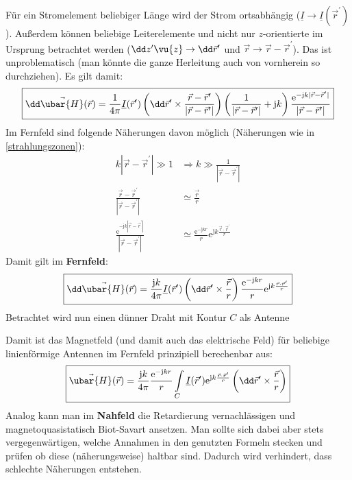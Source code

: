 Für ein Stromelement beliebiger Länge wird der Strom ortsabhängig (\(\underline{I}\to \underline{I}(\vec{r}^\prime )\)). Außerdem können beliebige Leiterelemente und nicht nur $z$-orientierte im Ursprung  betrachtet werden (\(\dd z^\prime \vu{z} \to \dd\vec{r}^\prime \) und \(\vec{r}  \to \vec{r}  - \vec{r}^\prime \)). Das ist unproblematisch (man könnte die ganze Herleitung auch von vornherein so durchziehen). Es gilt damit:
		        \begin{equation}
			        \boxed{\dd\vec{\ubar{H}}(\vec{r} ) = \frac{1}{4\pi} \underline{I}(\vec{r}^\prime ) \left( \dd\vec{r}^\prime  \times \frac{\vec{r} -\vec{r}^\prime }{|\vec{r} -\vec{r}^\prime |} \right) \left(\frac{1}{|\vec{r} -\vec{r}^\prime |} +\mathrm{j} k \right) \frac{ \mathrm{e}^{-\mathrm{j} k |\vec{r} -\vec{r}^\prime |}}{|\vec{r} -\vec{r}^\prime |}}
		        \end{equation}
Im Fernfeld sind folgende Näherungen davon möglich (Näherungen wie in \ref{strahlungszonen}):
		        \begin{equation}\begin{split}
				        k |\vec{r} -\vec{r}^\prime | \gg 1 &\Rightarrow  k \gg \frac{1}{|\vec{r} -\vec{r}^\prime |}\\
				        \frac{\vec{r} -\vec{r}^\prime }{|\vec{r} -\vec{r}^\prime |} &\simeq \frac{\vec{r} }{r}\\
				        \frac{ \mathrm{e}^{-\mathrm{j} k |\vec{r} -\vec{r}^\prime |}}{|\vec{r} -\vec{r}^\prime |} &\simeq \frac{ \mathrm{e}^{-\mathrm{j} k r}}{r}  \mathrm{e}^{\mathrm{j} k \frac{\vec{r} \cdot \vec{r}^\prime }{r}}
			        \end{split}\end{equation}
		  Damit gilt im \textbf{Fernfeld}:
		        \begin{equation}
			        \boxed{\dd\vec{\ubar{H}}(\vec{r} ) = \frac{\mathrm{j} k}{4\pi} \underline{I}(\vec{r}^\prime ) \left( \dd\vec{r}^\prime  \times \frac{\vec{r} }{r} \right) \frac{ \mathrm{e}^{-\mathrm{j} k r}}{r}  \mathrm{e}^{\mathrm{j} k \frac{\vec{r} \cdot \vec{r}^\prime }{r}}}
		        \end{equation}
	  Betrachtet wird nun einen dünner Draht mit Kontur \(C\) als Antenne
		        \begin{center}
			        
		        \end{center}
		  Damit ist das Magnetfeld (und damit auch das elektrische Feld) für beliebige linienförmige Antennen im Fernfeld prinzipiell berechenbar aus:
		        \begin{equation}\label{nhrgfernz}
			        \boxed{\vec{\ubar{H}}(\vec{r} ) = \frac{\mathrm{j} k}{4\pi} \frac{ \mathrm{e}^{-\mathrm{j} k r}}{r} \int\limits_{C}\underline{I}(\vec{r}^\prime )  \mathrm{e}^{\mathrm{j} k \frac{\vec{r} \cdot \vec{r}^\prime }{r}} \left( \dd\vec{r}^\prime  \times \frac{\vec{r} }{r} \right)}
		        \end{equation}
		        Analog kann man im \textbf{Nahfeld} die Retardierung vernachlässigen und magnetoquasistatisch Biot-Savart ansetzen. Man sollte sich dabei aber stets vergegenwärtigen, welche Annahmen in den genutzten Formeln stecken und prüfen ob diese (näherungsweise) haltbar sind. Dadurch wird verhindert, dass schlechte Näherungen entstehen.
